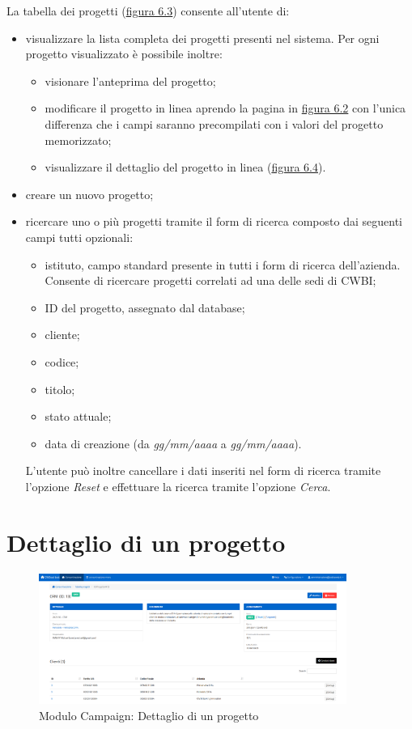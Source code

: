 \noindent La tabella dei progetti ({\hyperref[fig:tabellaProgetti]{figura 6.3}}) consente all'utente di:
\begin{itemize}
\item visualizzare la lista completa dei progetti presenti nel sistema. Per ogni progetto visualizzato è possibile inoltre: 
\begin{itemize}
\item visionare l'anteprima del progetto;
\item modificare il progetto in linea aprendo la pagina in  {\hyperref[fig:nuovoProgetto]{figura 6.2}} con l'unica differenza che i campi saranno precompilati con i valori del progetto memorizzato;
\item visualizzare il dettaglio del progetto in linea ({\hyperref[fig:dettaglioProgetto]{figura 6.4}}).
\end{itemize}

\item creare un nuovo progetto;
\item ricercare uno o più progetti tramite il form di ricerca composto dai seguenti campi tutti opzionali:
\begin{itemize}
\item istituto, campo standard presente in tutti i form di ricerca dell'azienda. Consente di ricercare progetti correlati ad una delle sedi di CWBI;
\item ID del progetto, assegnato dal database;
\item cliente;
\item codice;
\item titolo;	
\item stato attuale;
\item data di creazione (da \textit{gg/mm/aaaa} a \textit{gg/mm/aaaa}).
\end{itemize}
L'utente può inoltre cancellare i dati inseriti nel form di ricerca tramite l'opzione \textit{Reset} e effettuare la ricerca tramite l'opzione \textit{Cerca}.
\end{itemize}

\pagebreak

\section{Dettaglio di un progetto}
\begin{figure}[!h]
\centering
\includegraphics[width=380px]{../images/UI/04-dettaglioProgetto.png}
\caption{Modulo Campaign: Dettaglio di un progetto}
\label{fig:dettaglioProgetto}
\end{figure}

